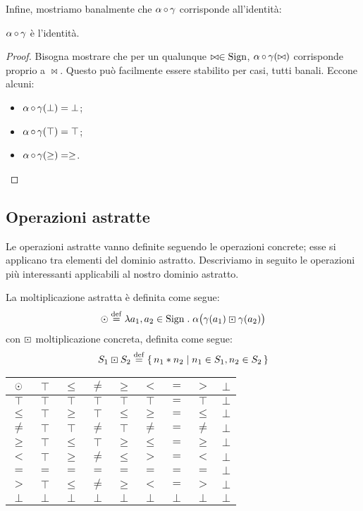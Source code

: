 Infine, mostriamo banalmente che $\mathrm{\alpha}\mathop{\circ}\mathrm{\gamma}$ corrisponde
all'identità:
\begin{proposizione}
  $\mathrm{\alpha}\mathop{\circ}\mathrm{\gamma}$ è l'identità.
\end{proposizione}
\begin{proof}
Bisogna mostrare che per un qualunque $\bowtie \in \mathrm{Sign}$,
$\mathrm{\alpha}\mathop{\circ}\mathrm{\gamma}(\bowtie)$ corrisponde proprio a $\bowtie$.
Questo può facilmente essere stabilito per casi, tutti banali.
Eccone alcuni:
\begin{itemize}
	\item $\mathrm{\alpha}\mathop{\circ}\mathrm{\gamma}(\bot) = \bot$;
    \item $\mathrm{\alpha}\mathop{\circ}\mathrm{\gamma}(\top) = \top$;
    \item $\mathrm{\alpha}\mathop{\circ}\mathrm{\gamma}(\geq) = \geq$.
\end{itemize}
\end{proof}

\subsection{Operazioni astratte}
Le operazioni astratte vanno definite seguendo le operazioni concrete;
esse si applicano tra elementi del dominio astratto.
Descriviamo in seguito le operazioni più interessanti applicabili
al nostro dominio astratto.

\begin{definizione}
La moltiplicazione astratta è definita come segue:
\[
  \absmul \defeq \lambda a_1,a_2 \in \Sign \st \alpha\bigl(\gamma(a_1) \conmul \gamma(a_2)\bigr)
\]
con $\mathbin{\boxdot}$ moltiplicazione concreta, definita come segue:
\[
  S_1 \conmul S_2 \defeq \{\, n_1 * n_2 \mid n_1 \in S_1, n_2 \in S_2 \,\}
\]
\end{definizione}

\begin{center}
  \begin{tabular}{ c | c c c c c c c c }
    $\mathbin{\odot}$ & $\top$ & $\leq$ & $\neq$ & $\geq$ & $<$ & $=$ & $>$ & $\bot$ \\
    \hline
    $\top$ & $\top$ & $\top$ & $\top$ & $\top$ & $\top$ & $=$ & $\top$ & $\bot$  \\
    $\leq$ & $\top$ & $\geq$ & $\top$ & $\leq$ & $\geq$ & $=$ & $\leq$ & $\bot$\\
    $\neq$ & $\top$ & $\top$ & $\neq$ & $\top$ & $\neq$ & $=$ & $\neq$ & $\bot$ \\
    $\geq$ & $\top$ & $\leq$ & $\top$ & $\geq$ & $\leq$ & $=$ & $\geq$ & $\bot$ \\
    $<$ & $\top$ & $\geq$ & $\neq$ & $\leq$ & $>$ & $=$ & $<$ & $\bot$ \\
    $=$ & $=$ & $=$ & $=$ & $=$ & $=$ & $=$ & $=$ & $\bot$\\
    $>$ & $\top$ & $\leq$ & $\neq$ & $\geq$ & $<$ & $=$ & $>$ & $\bot$\\
    $\bot$ & $\bot$ & $\bot$ & $\bot$ & $\bot$ & $\bot$ & $\bot$ & $\bot$ & $\bot$ \\
  \end{tabular}
\end{center}

